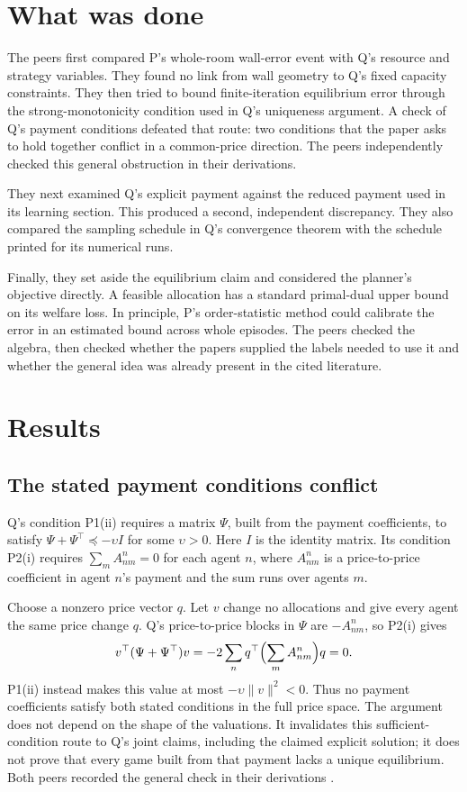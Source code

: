 \documentclass{article}
\begin{document}
\section{What was done}

The peers first compared P's whole-room wall-error event with Q's resource and strategy variables. They found no link
from wall geometry to Q's fixed capacity constraints. They then tried to bound finite-iteration equilibrium error
through the strong-monotonicity condition used in Q's uniqueness argument. A check of Q's payment conditions defeated
that route: two conditions that the paper asks to hold together conflict in a common-price direction. The peers
independently checked this general obstruction in their derivations.

They next examined Q's explicit payment against the reduced payment used in its learning section. This produced a
second, independent discrepancy. They also compared the sampling schedule in Q's convergence theorem with the
schedule printed for its numerical runs.

Finally, they set aside the equilibrium claim and considered the planner's objective directly. A feasible allocation
has a standard primal-dual upper bound on its welfare loss. In principle, P's order-statistic method could calibrate
the error in an estimated bound across whole episodes. The peers checked the algebra, then checked whether the papers
supplied the labels needed to use it and whether the general idea was already present in the cited literature.

\section{Results}

\subsection{The stated payment conditions conflict}

Q's condition P1(ii) requires a matrix \(\Psi\), built from the payment coefficients, to satisfy
\(\Psi+\Psi^{\top}\preceq-\upsilon I\) for some \(\upsilon>0\). Here \(I\) is the identity matrix. Its condition
P2(i) requires \(\sum_m A_{nm}^{n}=0\) for each agent \(n\), where \(A_{nm}^{n}\) is a price-to-price coefficient in
agent \(n\)'s payment and the sum runs over agents \(m\).

Choose a nonzero price vector \(q\). Let \(v\) change no allocations and give every agent the same price change
\(q\). Q's price-to-price blocks in \(\Psi\) are \(-A_{nm}^{n}\), so P2(i) gives
\[
v^{\top}(\Psi+\Psi^{\top})v
=-2\sum_n q^{\top}\Bigl(\sum_m A_{nm}^{n}\Bigr)q=0.
\]
P1(ii) instead makes this value at most \(-\upsilon\lVert v\rVert^2<0\). Thus no payment coefficients satisfy both
stated conditions in the full price space. The argument does not depend on the shape of the valuations. It
invalidates this sufficient-condition route to Q's joint claims, including the claimed explicit solution; it does not
prove that every game built from that payment lacks a unique equilibrium. Both peers recorded the general check in
their derivations \cite{Q}.
\end{document}
